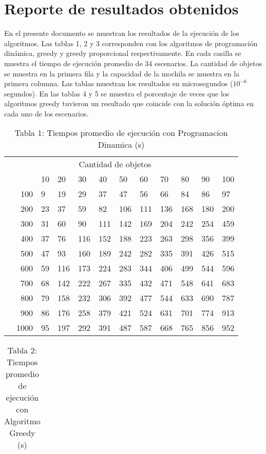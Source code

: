 \documentclass{article}
\begin{document}
\section*{Reporte de resultados obtenidos}
En el presente documento se muestran los resultados de la ejecución de los algoritmos. Las tablas 1, 2 y 3 corresponden con los algoritmos de programación dinámica, greedy y greedy proporcional respectivamente. En cada casilla se muestra el tiempo de ejecución promedio de 34 escenarios. La cantidad de objetos se muestra en la primera fila y la capacidad de la mochila se muestra en la primera columna. Las tablas muestran los resultados en microsegundos ($10^{-6}$ segundos).
En las tablas 4 y 5 se muestra el porcentaje de veces que los algoritmos greedy tuvieron un resultado que coincide con la solución óptima en cada uno de los escenarios.
\begin{center}
\begin{table}[ht]
\centering
\caption*{Tabla 1: Tiempos promedio de ejecución con Programacion Dinamica (\textmu s)}
\label{1}
\begin{tabularx}{0.8\textwidth}{Xr|XXXXXXXXXX}
&\multicolumn{10}{c}{Cantidad de objetos} \\
&&10&20&30&40&50&60&70&80&90&100\\\hline
\parbox[t]{2mm}{}&100&9&19&29&37&47&56&66&84&86&97\\
&200&23&37&59&82&106&111&136&168&180&200\\
&300&31&60&90&111&142&169&204&242&254&459\\
&400&37&76&116&152&188&223&263&298&356&399\\
&500&47&93&160&189&242&282&335&391&426&515\\
&600&59&116&173&224&283&344&406&499&544&596\\
&700&68&142&222&267&335&432&471&548&641&683\\
&800&79&158&232&306&392&477&544&633&690&787\\
&900&86&176&258&379&421&524&631&701&774&913\\
&1000&95&197&292&391&487&587&668&765&856&952\\
\end{tabularx}
\end{table}
\begin{table}[ht]
\centering
\caption*{Tabla 2: Tiempos promedio de ejecución con Algoritmo Greedy (\textmu s)}
\label{2}
\begin{tabularx}{0.8\textwidth}{Xr|XXXXXXXXXX}

\end{tabularx}
\end{table}
\end{center}
\end{document}
